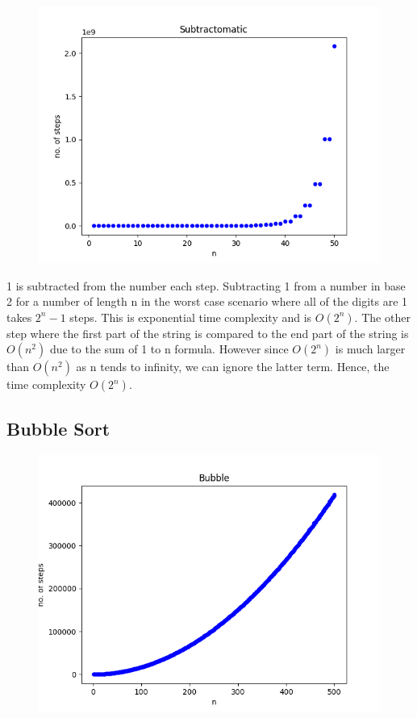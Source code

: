\documentclass{article}
\begin{document}
\begin{figure}[!htb]
  \caption{}
  \centering
  \includegraphics[scale=0.50]{images/subtractomatic_graph.png}
\end{figure}

1 is subtracted from the number each step. Subtracting 1 from a number in base 2 for a number of length n in the worst case scenario where all of the digits are 1 takes $2^n - 1$ steps. This is exponential time complexity and is $O(2^n)$. The other step where the first part of the string is compared to the end part of the string is $O(n^2)$ due to the sum of 1 to n formula. However since $O(2^n)$ is much larger than $O(n^2)$ as n tends to infinity, we can ignore the latter term. Hence, the time complexity $O(2^n)$.

\subsection{Bubble Sort}

\begin{figure}[!htb]
  \caption{}
  \centering
  \includegraphics[scale=0.50]{images/bubble_graph.png}
\end{figure}
\end{document}
